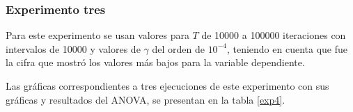 \subsubsection{Experimento tres}


Para este experimento se usan valores para $T$ de 10000 a 100000 iteraciones con intervalos de 10000 y valores de $\gamma$ del orden de $10^{-4}$, teniendo en cuenta que fue la cifra que mostró los valores más bajos para la variable dependiente. 

Las gráficas correspondientes a tres ejecuciones de este experimento con sus gráficas y resultados del ANOVA, se presentan en la tabla \ref{exp4}.

